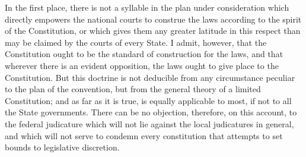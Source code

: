 In the first place, there is not a syllable in the plan under consideration which directly empowers the national courts to construe the laws according to the spirit of the Constitution, or which gives them any greater latitude in this respect than may be claimed by the courts of every State. 
I admit, however, that the Constitution ought to be the standard of construction for the laws, and that wherever there is an evident opposition, the laws ought to give place to the Constitution. 
But this doctrine is not deducible from any circumstance peculiar to the plan of the convention, but from the general theory of a limited Constitution; and as far as it is true, is equally applicable to most, if not to all the State governments. 
There can be no objection, therefore, on this account, to the federal judicature which will not lie against the local judicatures in general, and which will not serve to condemn every constitution that attempts to set bounds to legislative discretion.


